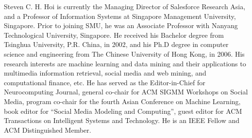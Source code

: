 \documentclass[journal]{IEEEtran}
\begin{document}
\begin{IEEEbiography}{Steven C. H. Hoi}
is currently the Managing Director of Salesforce Research Asia, and a Professor of Information Systems at Singapore Management University, Singapore. Prior to joining SMU, he was an Associate Professor with Nanyang Technological University, Singapore. He received his Bachelor degree from Tsinghua University, P.R. China, in 2002, and his Ph.D degree in computer science and engineering from The Chinese University of Hong Kong, in 2006. His research interests are machine learning and data mining and their applications to multimedia information retrieval, social media and web mining, and computational finance, etc. He has served as the Editor-in-Chief for Neurocomputing Journal, general co-chair for ACM SIGMM Workshops on Social Media, program co-chair for the fourth Asian Conference on Machine Learning, book editor for “Social Media Modeling and Computing”, guest editor for ACM Transactions on Intelligent Systems and Technology. He is an IEEE Fellow and ACM Distinguished Member.
\end{IEEEbiography}
\end{document}
